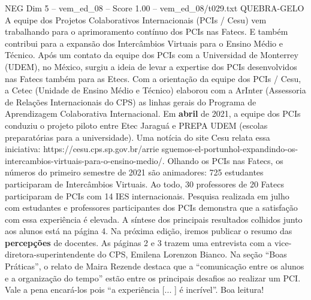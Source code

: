 \begin{textsample}{NEG Dim 5 – vem\_ed\_08 – Score 1.00 – vem\_ed\_08/t029.txt}  \label{ex:f5_neg_025}
QUEBRA-GELO A equipe dos Projetos Colaborativos Internacionais (PCIs / Cesu) vem trabalhando para o aprimoramento contínuo dos PCIs nas Fatecs.
E também contribui para a expansão dos Intercâmbios Virtuais para o Ensino Médio e Técnico.
Após um contato da equipe dos PCIs com a Universidad de Monterrey (UDEM), no México, surgiu a ideia de levar a expertise dos PCIs desenvolvidos nas Fatecs também para as Etecs.
Com a orientação da equipe dos PCIs / Cesu, a Cetec (Unidade de Ensino Médio e Técnico) elaborou com a ArInter (Assessoria de Relações Internacionais do CPS) as linhas gerais do Programa de Aprendizagem Colaborativa Internacional.
Em \textbf{abril} de 2021, a equipe dos PCIs conduziu o projeto piloto entre Etec Jaraguá e PREPA UDEM (escolas preparatórias para a universidade).
Uma notícia do site Cesu relata essa iniciativa: https://cesu.cps.sp.gov.br/arrie sguemos-el-portunhol-expandindo-os-intercambios-virtuais-para-o-ensino-medio/.
Olhando os PCIs nas Fatecs, os números do primeiro semestre de 2021 são animadores: 725 estudantes participaram de Intercâmbios Virtuais.
Ao todo, 30 professores de 20 Fatecs participaram de PCIs com 14 IES internacionais.
Pesquisa realizada em julho com estudantes e professores participantes dos PCIs demonstra que a satisfação com essa experiência é elevada.
A síntese dos principais resultados colhidos junto aos alunos está na página 4.
Na próxima edição, iremos publicar o resumo das \textbf{percepções} de docentes.
As páginas 2 e 3 trazem uma entrevista com a vice-diretora-superintendente do CPS, Emilena Lorenzon Bianco.
Na seção “Boas Práticas”, o relato de Maira Rezende destaca que a “comunicação entre os alunos e a organização do tempo” estão entre os principais desafios ao realizar um PCI.
Vale a pena encará-los pois “a experiência [... ] é incrível”.
Boa leitura!

\end{textsample}
